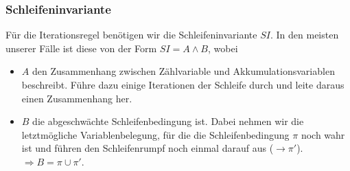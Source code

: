 \documentclass[aspectratio=1610,onlymath, ngerman, handout]{beamer}
\begin{document}
	\begin{frame} \frametitle{Schleifeninvariante}
	\small
		Für die Iterationsregel benötigen wir die Schleifeninvariante $SI$.
		In den meisten unserer Fälle ist diese von der Form $SI = A \land B$, wobei
		\begin{itemize}
			\item $A$ den Zusammenhang zwischen Zählvariable und Akkumulationsvariablen beschreibt. Führe dazu einige Iterationen der Schleife durch und leite daraus einen Zusammenhang her.
			\item $B$ die abgeschwächte Schleifenbedingung ist. Dabei nehmen wir die letztmögliche Variablenbelegung, für die die Schleifenbedingung $\pi$ noch wahr ist und führen den Schleifenrumpf noch einmal darauf aus ($\to \pi'$). \\
			$\Rightarrow B = \pi \cup \pi'$. 
		\end{itemize}
	\end{frame}
\end{document}
